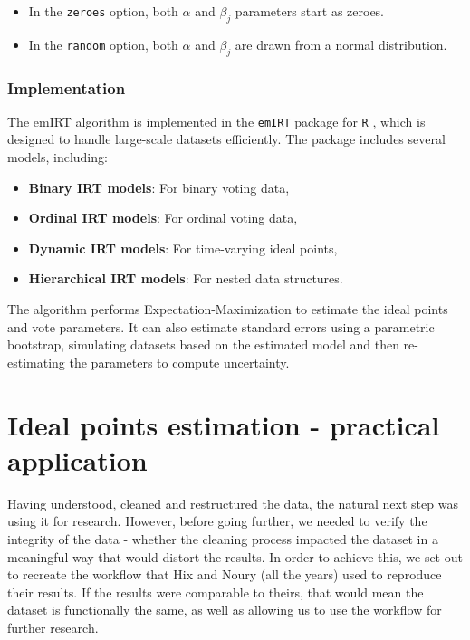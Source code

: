 \documentclass[a4paper,12pt]{report}
\begin{document}
                \begin{itemize}
                    \item In the \texttt{zeroes} option, both \(\alpha\) and \(\beta_j\) parameters start as zeroes.
                    \item In the \texttt{random} option, both \(\alpha\) and \(\beta_j\)
                    are drawn from a normal distribution.
                \end{itemize}

            \subsection{Implementation}
                The emIRT algorithm is implemented in the \texttt{emIRT} package for \texttt{R}
                , which is designed to handle large-scale datasets efficiently. The package includes several
                models, including:
                \begin{itemize}
                    \item \textbf{Binary IRT models}: For binary voting data,
                    \item \textbf{Ordinal IRT models}: For ordinal voting data,
                    \item \textbf{Dynamic IRT models}: For time-varying ideal points,
                    \item \textbf{Hierarchical IRT models}: For nested data structures.
                \end{itemize}
                The algorithm performs Expectation-Maximization to estimate the ideal points and vote parameters. It can
                also estimate standard errors using a parametric bootstrap, simulating datasets based on the estimated
                model and then re-estimating the parameters to compute uncertainty.


    \chapter{Ideal points estimation - practical application}
        \label{ch:ideal-points-estimation---practical-application}
        Having understood, cleaned and restructured the data, the natural next step was using it for research.
        However, before going further, we needed to verify the integrity of the data - whether the cleaning process
        impacted the dataset in a meaningful way that would distort the results. In order to achieve this, we set
        out to recreate the workflow that Hix and Noury (all the years) used to reproduce their results. If the
        results were comparable to theirs, that would mean the dataset is functionally the same, as well as allowing
        us to use the workflow for further research.
\end{document}
